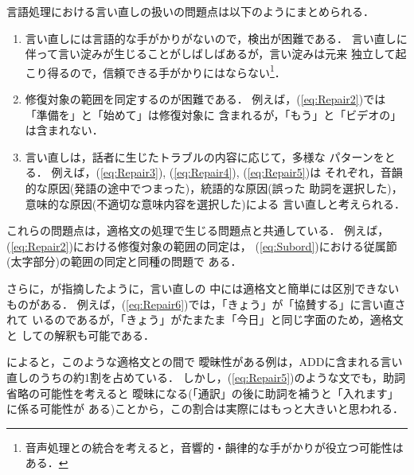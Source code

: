 言語処理における言い直しの扱いの問題点は以下のようにまとめられる．
\begin{enumerate}
\renewcommand{\theenumi}{}
\renewcommand{\labelenumi}{}
  \item 言い直しには言語的な手がかりがないので，検出が困難である．
言い直しに伴って言い淀みが生じることがしばしばあるが，言い淀みは元来
独立して起こり得るので，信頼できる手がかりにはならない\footnote{
  音声処理との統合を考えると，音響的・韻律的な手がかりが役立つ可能性は
ある\cite{O'Shaughnessy:ICSLP92-931,Nakatani:ACL93-46}．
}．
  \item 修復対象の範囲を同定するのが困難である．
例えば，(\ref{eq:Repair2})では「準備を」と「始めて」は修復対象に
含まれるが，「もう」と「ビデオの」は含まれない．
  \item 言い直しは，話者に生じたトラブルの内容に応じて，多様な
パターンをとる．
例えば，(\ref{eq:Repair3}), (\ref{eq:Repair4}), (\ref{eq:Repair5})は
それぞれ，音韻的な原因(発語の途中でつまった)，統語的な原因(誤った
助詞を選択した)，意味的な原因(不適切な意味内容を選択した)による
言い直しと考えられる．
\end{enumerate}

これらの問題点は，適格文の処理で生じる問題点と共通している．
例えば，(\ref{eq:Repair2})における修復対象の範囲の同定は，
(\ref{eq:Subord})における従属節(太字部分)の範囲の同定と同種の問題で
ある．

さらに，が指摘したように，言い直しの
中には適格文と簡単には区別できないものがある．
例えば，(\ref{eq:Repair6})では，「きょう」が「協賛する」に言い直されて
いるのであるが，「きょう」がたまたま「今日」と同じ字面のため，適格文と
しての解釈も可能である．

\citeauthor{佐川:IPSJ-NL-94-100-73}によると，このような適格文との間で
曖昧性がある例は，ADDに含まれる言い直しのうちの約1割を占めている．
しかし，(\ref{eq:Repair5})のような文でも，助詞省略の可能性を考えると
曖昧になる(「通訳」の後に助詞を補うと「入れます」に係る可能性が
ある)ことから，この割合は実際にはもっと大きいと思われる．

